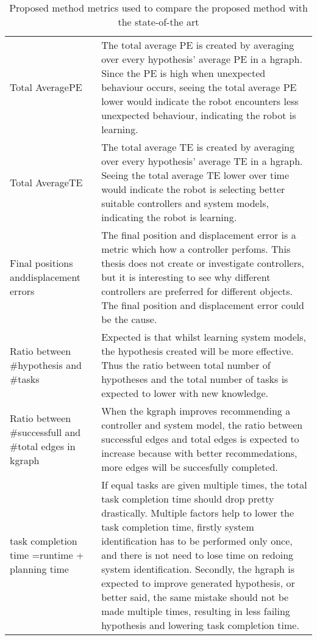 \begin{table}[htb!]
\centering
\begin{tabular}[t]{p{4cm} p{10cm}}
Total Average\newline \acl{PE} & The total average \ac{PE} is created by averaging over every hypothesis' average \ac{PE} in a \ac{hgraph}. Since the \ac{PE} is high when unexpected behaviour occurs, seeing the total average \ac{PE} lower would indicate the robot encounters less unexpected behaviour, indicating the robot is learning.\\
Total Average\newline \acl{TE}& The total average \ac{TE} is created by averaging over every hypothesis' average \ac{TE} in a \ac{hgraph}. Seeing the total average \ac{TE} lower over time would indicate the robot is selecting better suitable controllers and system models, indicating the robot is learning.\\
Final positions and\newline displacement errors & The final position and displacement error is a metric which how a controller perfoms. This thesis does not create or investigate controllers, but it is interesting to see why different controllers are preferred for different objects. The final position and displacement error could be the cause.\\
Ratio between \#hypothesis and \#tasks & Expected is that whilst learning system models, the hypothesis created will be more effective. Thus the ratio between total number of hypotheses and the total number of tasks is expected to lower with new knowledge.\\
Ratio between \#successfull and \#total edges in \ac{kgraph} & When the \ac{kgraph} improves recommending a controller and system model, the ratio between successful edges and total edges is expected to increase because with better recommedations, more edges will be succesfully completed.\\
task completion time =\newline runtime + planning time& If equal tasks are given multiple times, the total task completion time should drop pretty drastically. Multiple factors help to lower the task completion time, firstly system identification has to be performed only once, and there is not need to lose time on redoing system identification. Secondly, the \ac{hgraph} is expected to improve generated hypothesis, or better said, the same mistake should not be made multiple times, resulting in less failing hypothesis and lowering task completion time.\\
\end{tabular}
\caption{Proposed method metrics used to compare the proposed method with the state-of-the art}\label{table:proposed_method_metrics}
\end{table}

